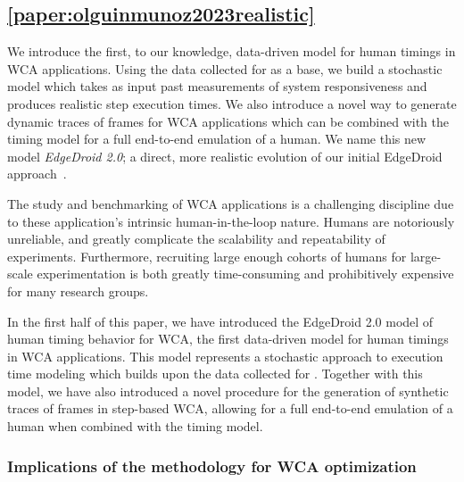 \FloatBarrier%
\subsection{\cref{paper:olguinmunoz2023realistic}}\label{summary:2023realistic}


We introduce the first, to our knowledge, data-driven model for human timings in \ac{WCA} applications.
Using the data collected for \textcite{olguinmunoz:impact2021} as a base, we build a stochastic model which takes as input past measurements of system responsiveness and produces realistic step execution times.
We also introduce a novel way to generate dynamic traces of frames for \ac{WCA} applications which can be combined with the timing model for a full end-to-end emulation of a human.
We name this new model \emph{EdgeDroid 2.0}; a direct, more realistic evolution of our initial EdgeDroid approach~\cite{olguin2018scaling,olguin2019edgedroid}.

The study and benchmarking of \ac{WCA} applications is a challenging discipline due to these application's intrinsic human-in-the-loop nature.
Humans are notoriously unreliable, and greatly complicate the scalability and repeatability of experiments.
Furthermore, recruiting large enough cohorts of humans for large-scale experimentation is both greatly time-consuming and prohibitively expensive for many research groups.

In the first half of this paper, we have introduced the EdgeDroid 2.0 model of human timing behavior for \ac{WCA}, the first data-driven model for human timings in \ac{WCA} applications.
This model represents a stochastic approach to execution time modeling which builds upon the data collected for \textcite{olguinmunoz:impact2021}.
Together with this model, we have also introduced a novel procedure for the generation of synthetic traces of frames in step-based \ac{WCA}, allowing for a full end-to-end emulation of a human when combined with the timing model.


\subsubsection{Implications of the methodology for \ac{WCA} optimization}


